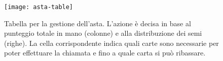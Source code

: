 %     


\begin{figure}[!htbp]
  \begin{center}
    \leavevmode
      \texttt{[image: asta-table]}
    \caption{Tabella per la gestione dell'asta. L'azione è decisa in base al punteggio totale in mano (colonne) e alla distribuzione dei semi (righe). La cella corrispondente indica quali carte sono necessarie per poter effettuare la chiamata e fino a quale carta si può ribassare.}
    \label{MazzoBriscola}
  \end{center}
\end{figure}

